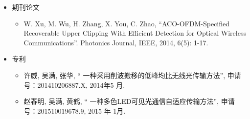 
\begin{Resume}
    \begin{itemize}
        \item 期刊论文
            \begin{itemize}
                \item W. Xu, M. Wu, H. Zhang, X. You, C. Zhao, ``ACO-OFDM-Specified Recoverable Upper Clipping With Efficient Detection for Optical Wireless Communications''.  Photonics Journal, IEEE, 2014, 6(5): 1-17.
            \end{itemize}
        \item 专利
            \begin{itemize}
                \item 许威, 吴满, 张华, `` 一种采用削波搬移的低峰均比无线光传输方法'', 申请号：201410206887.X, 2014年5 月.
            \end{itemize}
            \begin{itemize}
                \item 赵春明, 吴满, 黄鹤, `` 一种多色LED可见光通信自适应传输方法'', 申请号：201510019678.9, 2015 年 1月.
            \end{itemize}
    \end{itemize}
\end{Resume}
